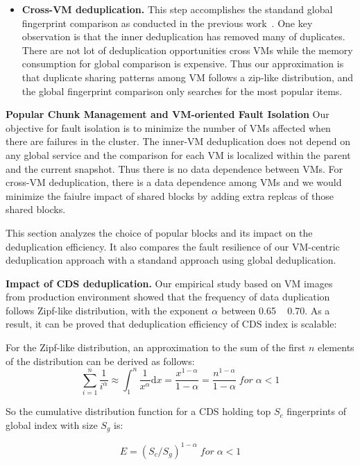 \begin{itemize}
\item \textbf{Cross-VM deduplication.}
This step accomplishes the standand global fingerprint  comparison as conducted
in the previous work~\cite{??}.
One key observation is that the inner deduplication has removed many of duplicates.
There are not lot of deduplication opportunities cross VMs while the memory
consumption for global comparison is expensive.
Thus our approximation is that duplicate sharing patterns among  VM follows
a zip-like distribution, and the global fingerprint  comparison  only searches
for the most popular items. 
\end{itemize}

{\bf Popular Chunk Management and VM-oriented Fault Isolation}
Our objective for fault isolation is to minimize the number of VMs affected when there are failures
in the cluster.  The inner-VM deduplication does not depend on any global service and the comparison
for each VM is localized within the parent and the current snapshot.
Thus there is no data dependence between VMs.
For cross-VM deduplication, there is a data dependence among VMs and we would minimize the faiulre impact
of shared blocks by adding extra replcas of those shared blocks.

This section analyzes the choice of popular blocks and its impact on the deduplication efficiency.
It also  compares the  fault resilience of our VM-centric deduplication approach with a standand approach using 
global deduplication.


{\bf Impact of CDS deduplication.}
Our empirical study based on VM images from production environment\cite{ieeecloud} showed that the
frequency of data duplication follows Zipf-like distribution\cite{zipf},
with the exponent $\alpha$ between 0.65 ~ 0.70.
As a result, it can be proved that deduplication efficiency of CDS index is scalable:

For the Zipf-like distribution, an approximation to the sum of the first $n$ 
elements of the distribution can be derived as follows:
\begin{equation}
\sum_{i=1}^{n}\frac{1}{i^\alpha}\approx \int_{1}^{n}\frac{1}{x^\alpha}\mathrm{d}x=\frac{x^{1-\alpha}}{1-\alpha}=\frac{n^{1-\alpha}}{1-\alpha}\;  for\;  \alpha<1
\end{equation}

So the cumulative distribution function for a CDS holding top $S_c$ fingerprints
of global index with size $S_g$ is:

\begin{equation}
  E = (S_c / S_g)^{1-\alpha} \;  for\;  \alpha<1
\end{equation}

